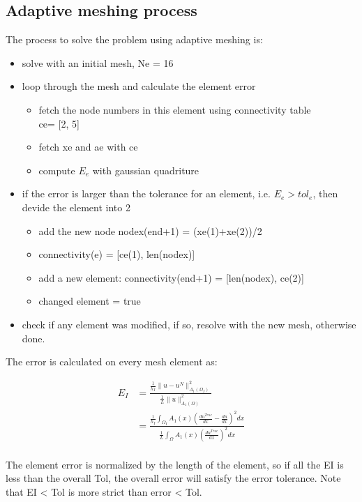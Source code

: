 \documentclass[a4paper, 12pt]{article} %
\begin{document}
\subsection{Adaptive meshing process}
The process to solve the problem using adaptive meshing is:
\begin{itemize}
\item solve with an initial mesh, Ne = 16
\item loop through the mesh and calculate the element error
    \begin{itemize}
    \item fetch the node numbers in this element using connectivity table \\ ce= [2, 5]
    \item fetch xe and ae with ce
    \item compute $E_e$ with gaussian quadriture
    \end{itemize}
\item if the error is larger than the tolerance for an element, i.e. $E_e>tol_e$, then devide the element into 2
    \begin{itemize}
    \item add the new node nodex(end+1) = (xe(1)+xe(2))/2
    \item connectivity(e) = [ce(1), len(nodex)]
    \item add a new element: connectivity(end+1) = [len(nodex), ce(2)]
    \item changed element = true
    \end{itemize}
\item check if any element was modified, if so, resolve with the new mesh, otherwise done.
\end{itemize}

The error is calculated on every mesh element as:

\begin{align}
E_I &= \frac{ \frac{1}{h_I} \| u-u^N \|^2_{A_1(\Omega_I)} }{ \frac{1}{L} \| u \|^2_{A_1(\Omega)} } \nonumber\\
    &= \frac{ \frac{1}{h_I} \int_{\Omega_I} A_1(x) (\frac{du ^{True}}{dx} - \frac{du}{dx}) ^2 dx}{ \frac{1}{L} \int_{\Omega}  A_1(x) (\frac{du^{True}}{dx} )^2 dx} \nonumber\\
\end{align}

The element error is normalized by the length of the element, so if all the EI is less than the overall Tol, the overall error will satisfy the error tolerance. Note that EI < Tol is more strict than error < Tol.
\end{document}
